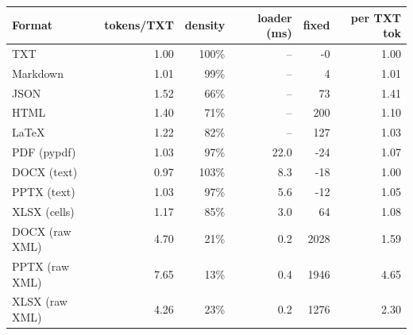 \begin{tabular}{lrrrrr}
\toprule
Format & tokens/TXT & density & loader (ms) & fixed & per TXT tok \\
\midrule
TXT & 1.00 & 100\% & -- & -0 & 1.00 \\
Markdown & 1.01 & 99\% & -- & 4 & 1.01 \\
JSON & 1.52 & 66\% & -- & 73 & 1.41 \\
HTML & 1.40 & 71\% & -- & 200 & 1.10 \\
LaTeX & 1.22 & 82\% & -- & 127 & 1.03 \\
PDF (pypdf) & 1.03 & 97\% & 22.0 & -24 & 1.07 \\
DOCX (text) & 0.97 & 103\% & 8.3 & -18 & 1.00 \\
PPTX (text) & 1.03 & 97\% & 5.6 & -12 & 1.05 \\
XLSX (cells) & 1.17 & 85\% & 3.0 & 64 & 1.08 \\
DOCX (raw XML) & 4.70 & 21\% & 0.2 & 2028 & 1.59 \\
PPTX (raw XML) & 7.65 & 13\% & 0.4 & 1946 & 4.65 \\
XLSX (raw XML) & 4.26 & 23\% & 0.2 & 1276 & 2.30 \\
\bottomrule
\end{tabular}
